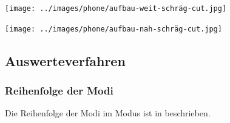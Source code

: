 \noindent\begin{minipage}[t]{\dimexpr.994\linewidth/3}\vspace{0pt}
    \begin{centering}
        \texttt{[image: ../images/phone/aufbau-weit-schräg-cut.jpg]}
        \vspace{-1.0em}
        \label{img:Aufbau-Weit-Schräg}
    \end{centering}
\end{minipage}

    \texttt{[image: ../images/phone/aufbau-nah-schräg-cut.jpg]}
    \vspace{-2.5em}
    \label{img:Aufbau-Nah-Schräg}



\subsection{Auswerteverfahren}\label{sec:Auswerteverfahren} %


\subsubsection{Reihenfolge der Modi}\label{sec:Reihenfolge-der-Modi} %

Die Reihenfolge der Modi im  Modus ist in  beschrieben.

